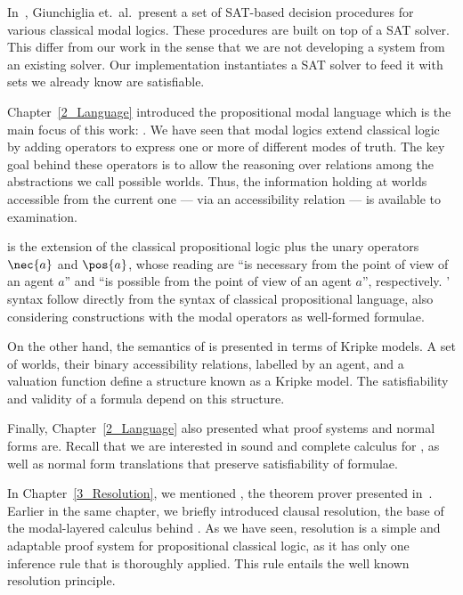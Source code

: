 In~\cite{giunchiglia2002sat}, Giunchiglia et.\ al.\ present a set of SAT-based
decision procedures for various classical modal logics. These procedures are
built on top of a SAT solver. This differ from our work in the sense that we are
not developing a system from an existing solver. Our implementation instantiates
a SAT solver to feed it with sets we already know are satisfiable.

Chapter~\ref{2_Language} introduced the propositional modal language which is
the main focus of this work: . We have seen that modal logics
extend classical logic by adding operators to express one or more of different
modes of truth.  The key goal behind these operators is to allow the reasoning
over relations among the abstractions we call possible worlds. Thus, the
information holding at worlds accessible from the current one --- via an
accessibility relation --- is available to examination.  

 is the extension of the classical propositional logic plus the
unary operators $\nec{a}$ and $\pos{a}$, whose reading are ``is necessary from
the point of view of an agent $a$'' and ``is possible from the point of view of
an agent $a$'', respectively. ' syntax follow directly from the
syntax of classical propositional language, also considering constructions with
the modal operators as well-formed formulae.

On the other hand, the semantics of  is presented in terms of
Kripke models. A set of worlds, their binary accessibility relations, labelled
by an agent, and a valuation function define a structure known as a Kripke
model. The satisfiability and validity of a formula depend on this
structure.

Finally, Chapter~\ref{2_Language} also presented what proof systems and normal
forms are. Recall that we are interested in sound and complete calculus for
, as well as normal form translations that preserve
satisfiability of formulae.

In Chapter~\ref{3_Resolution}, we mentioned \ksp, the theorem prover presented
in~\cite{Nalon2016}. Earlier in the same chapter, we briefly introduced clausal
resolution, the base of the modal-layered calculus behind \ksp. As we have seen,
resolution is a simple and adaptable proof system for propositional classical
logic, as it has only one inference rule that is thoroughly applied. This rule
entails the well known resolution principle.

